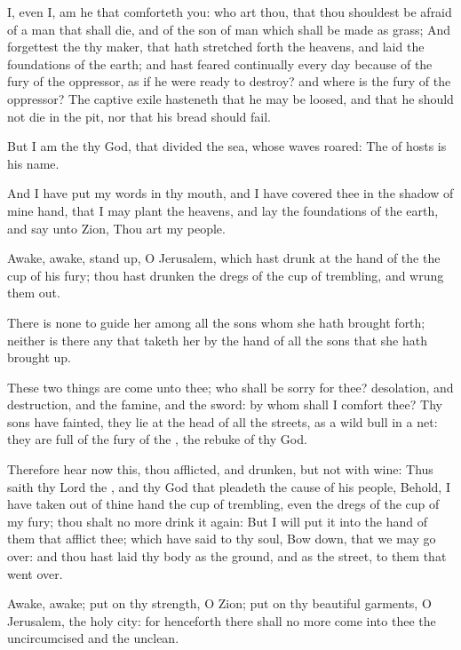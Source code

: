 \Verse I, even I, am he that comforteth you: who art thou, that thou shouldest be afraid of a man that shall die, and of the son of man which shall be made as grass; \Verse And forgettest the \LORD thy maker, that hath stretched forth the heavens, and laid the foundations of the earth; and hast feared continually every day because of the fury of the oppressor, as if he were ready to destroy? and where is the fury of the oppressor?  \Verse The captive exile hasteneth that he may be loosed, and that he should not die in the pit, nor that his bread should fail.

\Verse But I am the \LORD thy God, that divided the sea, whose waves roared: The \LORD of hosts is his name.

\Verse And I have put my words in thy mouth, and I have covered thee in the shadow of mine hand, that I may plant the heavens, and lay the foundations of the earth, and say unto Zion, Thou art my people.

\Verse Awake, awake, stand up, O Jerusalem, which hast drunk at the hand of the \LORD the cup of his fury; thou hast drunken the dregs of the cup of trembling, and wrung them out.

\Verse There is none to guide her among all the sons whom she hath brought forth; neither is there any that taketh her by the hand of all the sons that she hath brought up.

\Verse These two things are come unto thee; who shall be sorry for thee?  desolation, and destruction, and the famine, and the sword: by whom shall I comfort thee?  \Verse Thy sons have fainted, they lie at the head of all the streets, as a wild bull in a net: they are full of the fury of the \LORD, the rebuke of thy God.

\Verse Therefore hear now this, thou afflicted, and drunken, but not with wine: \Verse Thus saith thy Lord the \LORD, and thy God that pleadeth the cause of his people, Behold, I have taken out of thine hand the cup of trembling, even the dregs of the cup of my fury; thou shalt no more drink it again: \Verse But I will put it into the hand of them that afflict thee; which have said to thy soul, Bow down, that we may go over: and thou hast laid thy body as the ground, and as the street, to them that went over.


\Chapter
\Verse Awake, awake; put on thy strength, O Zion; put on thy beautiful garments, O Jerusalem, the holy city: for henceforth there shall no more come into thee the uncircumcised and the unclean.


